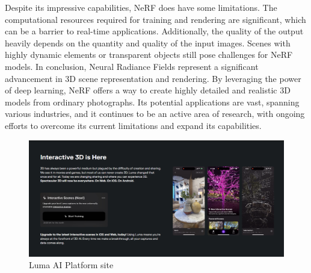 \singlespacing
Despite its impressive capabilities, NeRF does have some limitations. The computational resources required for training and rendering are significant, which can be a barrier to real-time applications. Additionally, the quality of the output heavily depends on the quantity and quality of the input images. Scenes with highly dynamic elements or transparent objects still pose challenges for NeRF models.
\singlespacing
In conclusion, Neural Radiance Fields represent a significant advancement in 3D scene representation and rendering. By leveraging the power of deep learning, NeRF offers a way to create highly detailed and realistic 3D models from ordinary photographs. Its potential applications are vast, spanning various industries, and it continues to be an active area of research, with ongoing efforts to overcome its current limitations and expand its capabilities.
\singlespacing
\begin{figure}[htbp]
  \centering
  \includegraphics[scale=0.35]{./Figure/画像20.png}
  \caption{Luma AI Platform site}
  \label{fig:Luma AI Platform site}
\end{figure}
